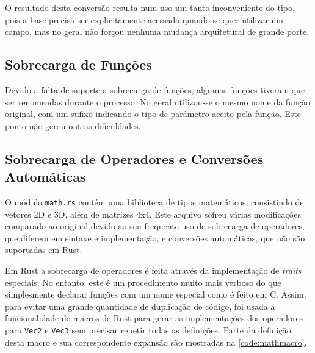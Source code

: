 \documentclass[tg]{mdtufsm}
\def\Cpp{{C\nolinebreak[4]\raisebox{.20ex}{\small\bf++}}}
\begin{document}
O resultado desta conversão resulta num uso um tanto inconveniente do tipo, pois a base precisa ser explicitamente acessada quando se quer utilizar um campo, mas no geral não forçou nenhuma mudança arquitetural de grande porte.

\subsection{Sobrecarga de Funções}

Devido a falta de suporte a sobrecarga de funções, algumas funções tiveram que ser renomeadas durante o processo. No geral utilizou-se o mesmo nome da função original, com um sufixo indicando o tipo de parâmetro aceito pela função. Este ponto não gerou outras dificuldades.

\subsection{Sobrecarga de Operadores e Conversões Automáticas}

O módulo \texttt{math.rs} contém uma biblioteca de tipos matemáticos, consistindo de vetores 2D e 3D, além de matrizes 4x4. Este arquivo sofreu várias modificações comparado ao original devido ao seu frequente uso de sobrecarga de operadores, que diferem em sintaxe e implementação, e conversões automáticas, que não são suportadas em Rust.

Em Rust a sobrecarga de operadores é feita através da implementação de \emph{traits} especiais. No entanto, este é um procedimento muito mais verboso do que simplesmente declarar funções com um nome especial como é feito em \Cpp. Assim, para evitar uma grande quantidade de duplicação de código, foi usada a funcionalidade de macros de Rust para gerar as implementações dos operadores para \texttt{Vec2} e \texttt{Vec3} sem precisar repetir todas as definições. Parte da definição desta macro e sua correspondente expansão são mostradas na \autoref{code:mathmacro}.
\end{document}
